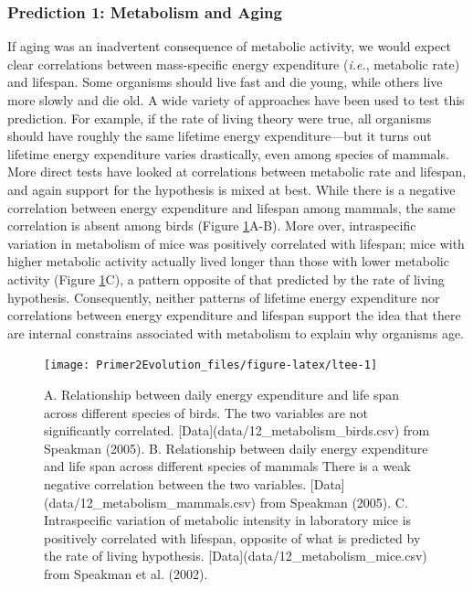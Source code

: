 \documentclass[
]{book}
\begin{document}
\hypertarget{prediction-1-metabolism-and-aging}{%
\subsubsection*{Prediction 1: Metabolism and Aging}\label{prediction-1-metabolism-and-aging}}

If aging was an inadvertent consequence of metabolic activity, we would expect clear correlations between mass-specific energy expenditure (\emph{i.e.}, metabolic rate) and lifespan. Some organisms should live fast and die young, while others live more slowly and die old. A wide variety of approaches have been used to test this prediction. For example, if the rate of living theory were true, all organisms should have roughly the same lifetime energy expenditure---but it turns out lifetime energy expenditure varies drastically, even among species of mammals. More direct tests have looked at correlations between metabolic rate and lifespan, and again support for the hypothesis is mixed at best. While there is a negative correlation between energy expenditure and lifespan among mammals, the same correlation is absent among birds (Figure \ref{fig:ltee}A-B). More over, intraspecific variation in metabolism of mice was positively correlated with lifespan; mice with higher metabolic activity actually lived longer than those with lower metabolic activity (Figure \ref{fig:ltee}C), a pattern opposite of that predicted by the rate of living hypothesis. Consequently, neither patterns of lifetime energy expenditure nor correlations between energy expenditure and lifespan support the idea that there are internal constrains associated with metabolism to explain why organisms age.

\begin{figure}
\texttt{[image: Primer2Evolution\_files/figure-latex/ltee-1]} \caption{A. Relationship between daily energy expenditure and life span across different species of birds. The two variables are not significantly correlated. [Data](data/12_metabolism_birds.csv) from Speakman (2005). B. Relationship between daily energy expenditure and life span across different species of mammals There is a weak negative correlation between the two variables. [Data](data/12_metabolism_mammals.csv) from Speakman (2005). C. Intraspecific variation of metabolic intensity in laboratory mice is positively correlated with lifespan, opposite of what is predicted by the rate of living hypothesis. [Data](data/12_metabolism_mice.csv) from Speakman et al. (2002).}\label{fig:ltee}
\end{figure}
\end{document}
